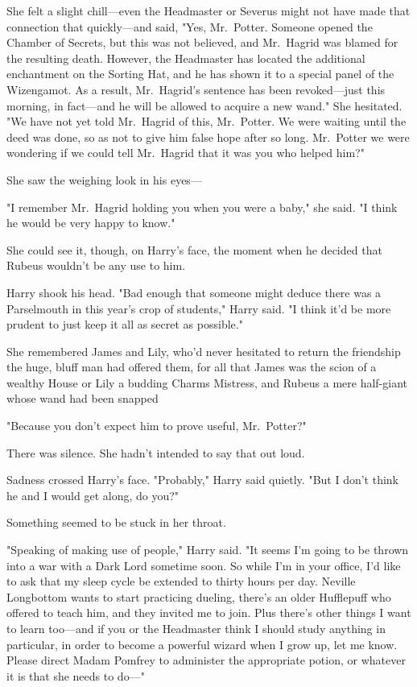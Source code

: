 She felt a slight chill---even the Headmaster or Severus might not have made
that connection that quickly---and said, "Yes, Mr.~Potter. Someone opened the
Chamber of Secrets, but this was not believed, and Mr.~Hagrid was blamed for
the resulting death. However, the Headmaster has located the additional
enchantment on the Sorting Hat, and he has shown it to a special panel of the
Wizengamot. As a result, Mr.~Hagrid's sentence has been revoked---just this
morning, in fact---and he will be allowed to acquire a new wand." She
hesitated. "We{\el} have not yet told Mr.~Hagrid of this, Mr.~Potter. We
were waiting until the deed was done, so as not to give him false hope after so
long. Mr.~Potter{\el} we were wondering if we could tell Mr.~Hagrid that it
was you who helped him\el?"

She saw the weighing look in his eyes---

"I remember Mr.~Hagrid holding you when you were a baby," she said. "I think he
would be very happy to know."

She could see it, though, on Harry's face, the moment when he decided that
Rubeus wouldn't be any use to him.

Harry shook his head. "Bad enough that someone might deduce there was a
Parselmouth in this year's crop of students," Harry said. "I think it'd be more
prudent to just keep it all as secret as possible."

She remembered James and Lily, who'd never hesitated to return the friendship
the huge, bluff man had offered them, for all that James was the scion of a
wealthy House or Lily a budding Charms Mistress, and Rubeus a mere half-giant
whose wand had been snapped{\el}

"Because you don't expect him to prove useful, Mr.~Potter?"

There was silence. She hadn't intended to say that out loud.

Sadness crossed Harry's face. "Probably," Harry said quietly. "But I don't
think he and I would get along, do you?"

Something seemed to be stuck in her throat.

"Speaking of making use of people," Harry said. "It seems I'm going to be
thrown into a war with a Dark Lord sometime soon. So while I'm in your office,
I'd like to ask that my sleep cycle be extended to thirty hours per day.
Neville Longbottom wants to start practicing dueling, there's an older
Hufflepuff who offered to teach him, and they invited me to join. Plus there's
other things I want to learn too---and if you or the Headmaster think I should
study anything in particular, in order to become a powerful wizard when I grow
up, let me know. Please direct Madam Pomfrey to administer the appropriate
potion, or whatever it is that she needs to do\mbox{---}"

